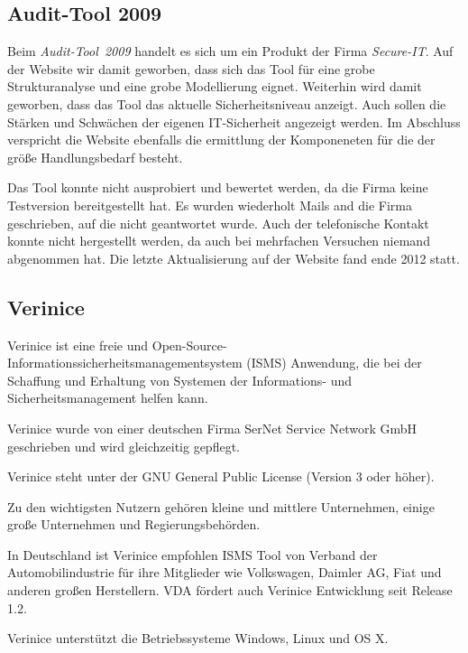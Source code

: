 \subsection{Audit-Tool 2009}
Beim \textit{Audit-Tool~2009} handelt es sich um ein Produkt der Firma \textit{Secure-IT}.
Auf der Website wir damit geworben, dass sich das Tool für eine grobe Strukturanalyse und eine grobe Modellierung
eignet.
Weiterhin wird damit geworben, dass das Tool das aktuelle Sicherheitsniveau anzeigt. Auch sollen die Stärken und Schwächen  der
eigenen IT-Sicherheit angezeigt werden.
Im Abschluss verspricht die Website ebenfalls die ermittlung der Komponeneten für die der 
größe Handlungsbedarf besteht.

Das Tool konnte nicht ausprobiert und bewertet werden, da die Firma keine Testversion bereitgestellt hat.
Es wurden wiederholt Mails and die Firma geschrieben, auf die nicht geantwortet wurde.
Auch der telefonische Kontakt konnte nicht hergestellt werden, da auch bei mehrfachen Versuchen niemand abgenommen hat.
Die letzte Aktualisierung auf der Website fand ende 2012 statt.


\subsection{Verinice}
Verinice ist eine freie und Open-Source-Informationssicherheitsmanagementsystem (ISMS) Anwendung, die bei der Schaffung und Erhaltung von Systemen der Informations- und Sicherheitsmanagement helfen kann.

Verinice wurde von einer deutschen Firma SerNet Service Network GmbH geschrieben und wird gleichzeitig gepflegt.

Verinice steht unter der GNU General Public License (Version 3 oder höher).

Zu den wichtigsten Nutzern gehören kleine und mittlere Unternehmen, einige große Unternehmen und Regierungsbehörden.

In Deutschland ist Verinice empfohlen ISMS Tool von Verband der Automobilindustrie 
für ihre Mitglieder wie Volkswagen, Daimler AG, Fiat und anderen großen Herstellern.
VDA fördert auch Verinice Entwicklung seit Release 1.2.

Verinice unterstützt die Betriebssysteme Windows, Linux und OS X.

